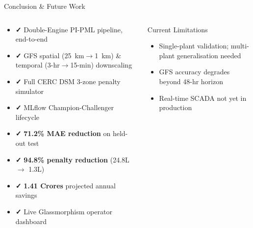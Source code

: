 \documentclass[aspectratio=169,10pt]{beamer}
\newcommand{\emphgreen}[1]{{\color{MLgreen}\textbf{#1}}}
\newcommand{\emphred}[1]{{\color{DSMred}\textbf{#1}}}
\newcommand{\rupee}{\textnumero}
\begin{document}
\begin{frame}{Conclusion \& Future Work}
  \begin{columns}[T]
      \begin{tcolorbox}[greenbox, title={\faTrophy\; Key Achievements}]
        \begin{itemize}[leftmargin=1em, itemsep=4pt, font=\small]
          \item \emphgreen{\faCheck} Double-Engine PI-PML pipeline, end-to-end
          \item \emphgreen{\faCheck} GFS spatial (25~km$\to$1~km) \& temporal (3-hr$\to$15-min) downscaling
          \item \emphgreen{\faCheck} Full CERC DSM 3-zone penalty simulator
          \item \emphgreen{\faCheck} MLflow Champion-Challenger lifecycle
          \item \emphgreen{\faCheck} \textbf{71.2\% MAE reduction} on held-out test
          \item \emphgreen{\faCheck} \textbf{94.8\% penalty reduction} (\rupee{}24.8L $\to$ \rupee{}1.3L)
          \item \emphgreen{\faCheck} \emphred{\rupee{}1.41 Crores} projected annual savings
          \item \emphgreen{\faCheck} Live Glassmorphism operator dashboard
        \end{itemize}
      \end{tcolorbox}

      \begin{block}{Current Limitations}
        \begin{itemize}[leftmargin=1em, itemsep=3pt, font=\small]
          \item Single-plant validation; multi-plant generalisation needed
          \item GFS accuracy degrades beyond 48-hr horizon
          \item Real-time SCADA not yet in production
        \end{itemize}
      \end{block}


\end{columns}
\end{frame}
\end{document}
